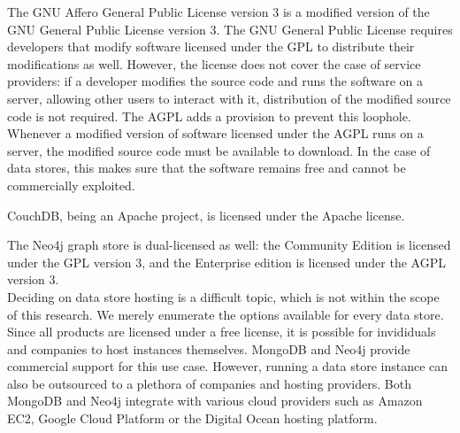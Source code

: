 The GNU Affero General Public License version 3 is a modified version of the GNU General Public License version 3.
The GNU General Public License requires developers that modify software licensed under the GPL to distribute their modifications as well.
However, the license does not cover the case of service providers: if a developer modifies the source code and runs the software on a server, allowing other users to interact with it, distribution of the modified source code is not required.
The AGPL adds a provision to prevent this loophole.
Whenever a modified version of software licensed under the AGPL runs on a server, the modified source code must be available to download.
In the case of data stores, this makes sure that the software remains free and cannot be commercially exploited.

CouchDB, being an Apache project, is licensed under the Apache license.

The Neo4j graph store is dual-licensed as well: the Community Edition is licensed under the GPL version 3, and the Enterprise edition is licensed under the AGPL version 3.\\
Deciding on data store hosting is a difficult topic, which is not within the scope of this research.
We merely enumerate the options available for every data store.
Since all products are licensed under a free license, it is possible for invididuals and companies to host instances themselves.
MongoDB and Neo4j provide commercial support for this use case.
However, running a data store instance can also be outsourced to a plethora of companies and hosting providers.
Both MongoDB and Neo4j integrate with various cloud providers such as Amazon EC2, Google Cloud Platform or the Digital Ocean hosting platform.\\

